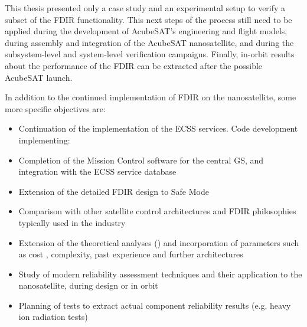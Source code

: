 \documentclass[a4paper,nobib]{tufte-book}
\begin{document}
\begin{fullwidth}
This thesis presented only a case study and an experimental setup to verify a subset of the \acs{FDIR} functionality. This next steps of the process still need to be applied during the development of AcubeSAT's engineering and flight models, during assembly and integration of the AcubeSAT nanosatellite, and during the subsystem-level and system-level verification campaigns. Finally, in-orbit results about the performance of the \acs{FDIR} can be extracted after the possible AcubeSAT launch.

In addition to the continued implementation of \acs{FDIR} on the nanosatellite, some more specific objectives are:
\begin{itemize}
	\item Continuation of the implementation of the \acs{ECSS} services. Code development implementing:
	\item Completion of the Mission Control software for the central \acl{GS}, and integration with the \acs{ECSS} service database 
	\item Extension of the detailed \acs{FDIR} design to Safe Mode
	\item Comparison with other satellite control architectures and \acs{FDIR} philosophies typically used in the industry \parencite{NASA-HDBK-1002,zolghadri_advanced_modelbased_2012}
	\item Extension of the theoretical analyses () and incorporation of parameters such as cost \parencite{chang_development_reliabilitycorrected_2013}, complexity, past experience and further architectures
	\item Study of modern reliability assessment techniques and their application to the nanosatellite, during design or in orbit
	\item Planning of tests to extract actual component reliability results (e.g. heavy ion radiation tests)
\end{itemize}




\end{fullwidth}

\appendix

\begin{fullwidth}
\printbibliography[heading=bibnumbered]
\end{fullwidth}


\printindex
\end{document}
